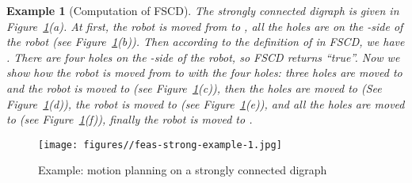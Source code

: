 \documentclass{article}
\newtheorem{exmp}[thm]{Example}
\begin{document}
\begin{exmp}[Computation of FSCD]
The strongly connected digraph is given in
Figure~\ref{fig:feas-strong-example-1}(a). At first, the robot is
moved from  to , all the holes are on the -side of the
robot (see Figure~\ref{fig:feas-strong-example-1}(b)). Then
according to the definition of  in FSCD, we have . There are
four holes on the -side of the robot, so FSCD returns ``true''.
Now we show how the robot is moved from  to  with the four
holes: three holes are moved to  and the robot is moved
to  (see Figure~\ref{fig:feas-strong-example-1}(c)), then the
holes are moved to  (See
Figure~\ref{fig:feas-strong-example-1}(d)), the robot is moved to
 (see Figure~\ref{fig:feas-strong-example-1}(e)), and all the
holes are moved to  (see
Figure~\ref{fig:feas-strong-example-1}(f)), finally the robot is
moved to .
\end{exmp}

\begin{figure}[ht]
\centering
  \texttt{[image: figures//feas-strong-example-1.jpg]}
  \caption{Example: motion planning on a strongly connected digraph}\label{fig:feas-strong-example-1}
\end{figure}
\end{document}
